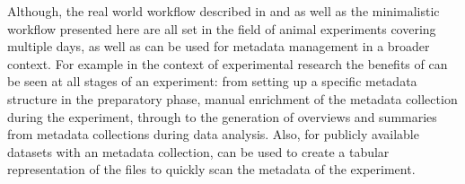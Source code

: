 Although, the real world workflow described in \cite{Brochier_2018} and \cite{Zehl_2016} as well as the minimalistic workflow presented here are all set in the field of animal experiments covering multiple days,  as well as  can be used for metadata management in a broader context. For example in the context of experimental research the benefits of  can be seen at all stages of an experiment: from setting up a specific metadata structure in the preparatory phase, manual enrichment of the metadata collection during the experiment, through to the generation of overviews and summaries from metadata collections during data analysis. Also, for publicly available datasets with an  metadata collection,  can be used to create a tabular representation of the  files to quickly scan the metadata of the experiment.

